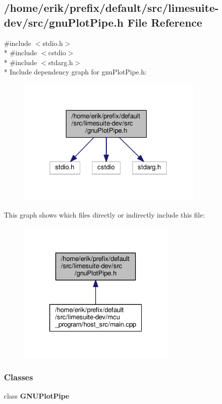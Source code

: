 \subsection{/home/erik/prefix/default/src/limesuite-\/dev/src/gnu\+Plot\+Pipe.h File Reference}
\label{gnuPlotPipe_8h}
{\ttfamily \#include $<$stdio.\+h$>$}\\*
{\ttfamily \#include $<$cstdio$>$}\\*
{\ttfamily \#include $<$stdarg.\+h$>$}\\*
Include dependency graph for gnu\+Plot\+Pipe.\+h\+:
\nopagebreak
\begin{figure}[H]
\begin{center}
\leavevmode
\includegraphics[width=258pt]{dd/d1f/gnuPlotPipe_8h__incl}
\end{center}
\end{figure}
This graph shows which files directly or indirectly include this file\+:
\nopagebreak
\begin{figure}[H]
\begin{center}
\leavevmode
\includegraphics[width=220pt]{d5/d5e/gnuPlotPipe_8h__dep__incl}
\end{center}
\end{figure}
\subsubsection*{Classes}
\begin{DoxyCompactItemize}
\item 
class {\bf G\+N\+U\+Plot\+Pipe}
\end{DoxyCompactItemize}
